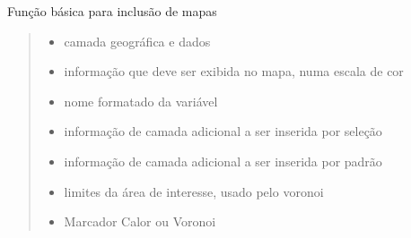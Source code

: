 \documentclass[letterpaper,10pt,brazil]{sphinxmanual}
\begin{document}
\begin{fulllineitems}
\label{\detokenize{pdcvis:app.addMap}}
\pysigstartsignatures
{}
\pysigstopsignatures
\sphinxAtStartPar
Função básica para inclusão de mapas
\begin{quote}\begin{description}
\begin{itemize}
\item {} 
\sphinxAtStartPar
{} \textendash{} camada geográfica e dados

\item {} 
\sphinxAtStartPar
{} \textendash{} informação que deve ser exibida no mapa, numa escala de cor

\item {} 
\sphinxAtStartPar
{} \textendash{} nome formatado da variável

\item {} 
\sphinxAtStartPar
{} \textendash{} informação de camada adicional a ser inserida por seleção

\item {} 
\sphinxAtStartPar
{} \textendash{} informação de camada adicional a ser inserida por padrão

\item {} 
\sphinxAtStartPar
{} \textendash{} limites da área de interesse, usado pelo voronoi

\item {} 
\sphinxAtStartPar
{} \textendash{} Marcador \sphinxhyphen{} Calor ou Voronoi

\end{itemize}

\end{description}\end{quote}

\end{fulllineitems}
\end{document}
